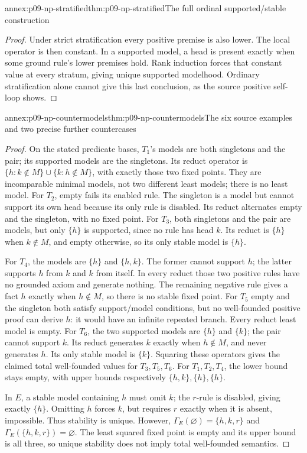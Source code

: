 \begin{annexitem}{annex:p09-np-stratified}{thm:p09-np-stratified}{The full ordinal supported/stable construction}
\begin{proof}
Under strict stratification every positive premise is also lower.
The local operator is then constant. In a supported model, a head
is present exactly when some ground rule's lower premises hold.
Rank induction forces that constant value at every stratum, giving
unique supported modelhood. Ordinary stratification alone cannot
give this last conclusion, as the source positive self-loop shows.
\end{proof}
\end{annexitem}

\begin{annexitem}{annex:p09-np-countermodels}{thm:p09-np-countermodels}{The six source examples and two precise further countercases}
\begin{proof}
On the stated predicate bases, \(T_1\)'s models are both singletons
and the pair; its supported models are the singletons. Its reduct
operator is \(\{h:k\notin M\}\cup\{k:h\notin M\}\),
with exactly those two fixed points. They are incomparable minimal
models, not two different least models; there is no least model.
For \(T_2\), empty fails its enabled rule. The singleton is a
model but cannot support its own head because its only rule is
disabled. Its reduct alternates empty and the singleton, with no
fixed point. For \(T_3\), both singletons and the pair are models,
but only \(\{h\}\) is supported, since no rule has head \(k\).
Its reduct is \(\{h\}\) when \(k\notin M\), and empty
otherwise, so its only stable model is \(\{h\}\).

For \(T_4\), the models are \(\{h\}\) and \(\{h,k\}\).
The former cannot support \(h\); the latter supports \(h\)
from \(k\) and \(k\) from itself. In every reduct those two
positive rules have no grounded axiom and generate nothing. The
remaining negative rule gives a fact \(h\) exactly when
\(h\notin M\), so there is no stable fixed point. For \(T_5\)
empty and the singleton both satisfy support/model conditions,
but no well-founded positive proof can derive \(h\): it would
have an infinite repeated branch. Every reduct least model is
empty. For \(T_6\), the two supported models are \(\{h\}\)
and \(\{k\}\); the pair cannot support \(k\). Its reduct
generates \(k\) exactly when \(h\notin M\), and never
generates \(h\). Its only stable model is \(\{k\}\).
Squaring these operators gives the claimed total well-founded
values for \(T_3,T_5,T_6\). For \(T_1,T_2,T_4\), the
lower bound stays empty, with upper bounds respectively
\(\{h,k\},\{h\},\{h\}\).

In \(E\), a stable model containing \(h\) must omit \(k\);
the \(r\)-rule is disabled, giving exactly \(\{h\}\).
Omitting \(h\) forces \(k\), but requires \(r\) exactly
when it is absent, impossible. Thus stability is unique. However,
\(\Gamma_E(\varnothing)=\{h,k,r\}\) and
\(\Gamma_E(\{h,k,r\})=\varnothing\). The least squared
fixed point is empty and its upper bound is all three, so unique
stability does not imply total well-founded semantics.


\end{proof}
\end{annexitem}
